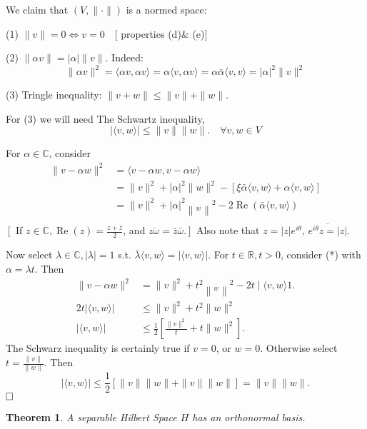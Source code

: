 \documentclass{tufte-handout}
\newtheorem{theorem}{Theorem}[section]
\begin{document}
We claim that $(V,\|\cdot\|)$ is a normed space:

(1) $\|v\|=0 \Leftrightarrow v=0 \quad[$ properties (d)\& (e)]

(2) $\|\alpha v\|=|\alpha|\|v\|$. Indeed:
\begin{equation*}
\|\alpha v\|^2=\langle\alpha v, \alpha v\rangle=\alpha\langle v, \alpha v\rangle=\alpha \bar{\alpha}\langle v, v\rangle=|\alpha|^2\|v\|^2
\end{equation*}

(3) Tringle inequality: $\|v+w\| \leqslant\|v\|+\|w\|$.

For (3) we will need
The Schwartz inequality, \[|\langle v, w\rangle| \leqslant\|v\|\|w\| . \quad \forall v, w \in V\]

For $\alpha \in \mathbb C$, consider 
\begin{equation*}
\begin{aligned}
 \|v-\alpha w\|^2 &=\langle v-\alpha w, v-\alpha w\rangle\\
 &=\|v\|^2+|\alpha|^2\|w\|^2 -[\xi \bar{\alpha}\langle v, w\rangle+\alpha\langle v, w\rangle] \\
 & =\|v\|^2+|\alpha|^2\left\|_w\right\|^2-2 \operatorname{Re}(\bar{\alpha}\langle v, w\rangle) \\
\end{aligned}
\end{equation*}
$\left[\right.$ If $z \in \mathbb{C}, \operatorname{Re}(z)=\frac{z+\bar{z}}{2}$, and $\left.\overline{z \omega}=\bar{z} \bar{\omega}.\right]$ Also note that $z=|z|e^{i\theta}$, $\overline{e^{i\theta}z=|z|}$.

Now select $\lambda \in \mathbb C, |\lambda|=1$ s.t. $\bar{\lambda}\langle v, w\rangle=|\langle v, w\rangle|$.
For $t \in \mathbb{R}, t>0$, consider (*) with $\alpha=\lambda t$. Then 
\begin{align*}
    \|v-\alpha w\|^2&=\|v\|^2+t^2\left\|_w\right\|^2-2 t \mid\langle v, w\rangle 1.\\
    2t|\langle v,w \rangle| & \leq \|v\|^2+t^2\|w\|^2\\
    |\langle v, w\rangle| &\leqslant \frac{1}{2}\left[\frac{\|v\|^2}{t}+t\|w\|^2\right] .
\end{align*}
The Schwarz inequality is certainly true if $v=0$, or $w=0$. Otherwise select $t=\frac{\|v\|}{\|w\|}$. Then 
\begin{equation}
|\langle v, w\rangle| \leqslant \frac{1}{2}[\|v\|\|w\|+\|v\|\|w\|]=\|v\|\|w\| .
\end{equation}
$\hfill \square$
\begin{theorem}
    A separable Hilbert Space $H$ has an orthonormal basis.
\end{theorem}
\end{document}
